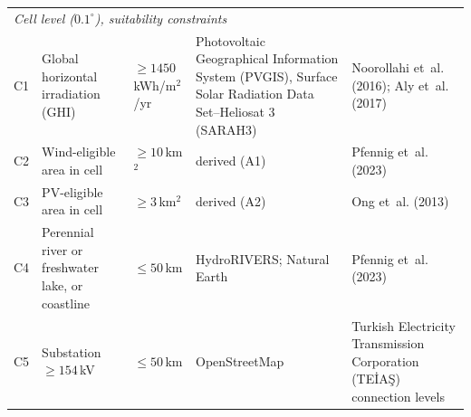 \begin{table}[htbp]
{\begin{tabular}{llllp{5.2cm}}
\midrule
\multicolumn{5}{l}{\textit{Cell level ($0.1^\circ$), suitability constraints}} \\
C1 & Global horizontal irradiation (GHI) & $\ge 1450$\,kWh/m$^2$/yr & Photovoltaic Geographical Information System (PVGIS), Surface Solar Radiation Data Set--Heliosat 3 (SARAH3) & Noorollahi et~al. (2016); Aly et~al. (2017) \\
C2 & Wind-eligible area in cell & $\ge 10$\,km$^2$ & derived (A1) & Pfennig et~al. (2023) \\
C3 & PV-eligible area in cell & $\ge 3$\,km$^2$ & derived (A2) & Ong et~al. (2013) \\
C4 & Perennial river or freshwater lake, or coastline & $\le 50$\,km & HydroRIVERS; Natural Earth & Pfennig et~al. (2023) \\
C5 & Substation $\ge 154$\,kV & $\le 50$\,km & OpenStreetMap & Turkish Electricity Transmission Corporation (TEİAŞ) connection levels \\
\bottomrule
\end{tabular}%
}
\end{table}

